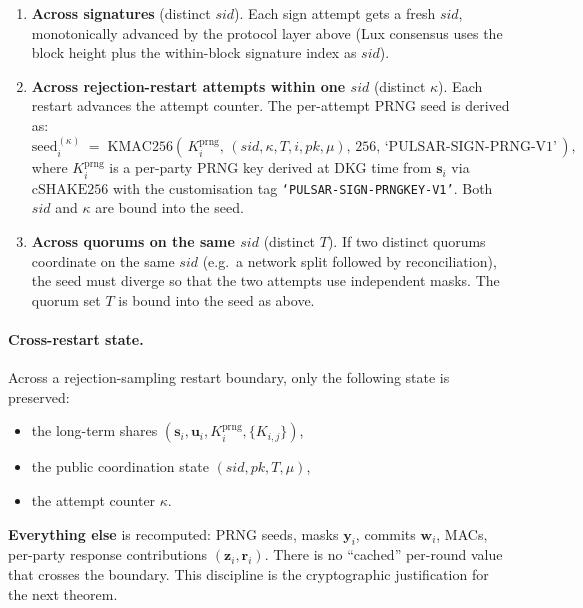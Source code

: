 \documentclass[11pt,a4paper]{article}
\theoremstyle{definition}
\theoremstyle{remark}
\newcommand{\cSHAKE}{\mathrm{cSHAKE256}}
\newcommand{\KMAC}{\mathrm{KMAC256}}
\begin{document}
\begin{enumerate}[leftmargin=*, itemsep=0pt]
\item \textbf{Across signatures} (distinct $\mathit{sid}$). Each
sign attempt gets a fresh $\mathit{sid}$, monotonically advanced
by the protocol layer above (Lux consensus uses the block height
plus the within-block signature index as $\mathit{sid}$).
\item \textbf{Across rejection-restart attempts within one
$\mathit{sid}$} (distinct $\kappa$). Each restart advances the
attempt counter. The per-attempt PRNG seed is derived as:
\[
\text{seed}_i^{(\kappa)} \;=\;
\KMAC(\,K_i^{\mathrm{prng}},\,
(\mathit{sid}, \kappa, T, i, \mathit{pk}, \mu),\,
256,\,
\text{`PULSAR-SIGN-PRNG-V1'}\,),
\]
where $K_i^{\mathrm{prng}}$ is a per-party PRNG key derived at DKG
time from $\mathbf{s}_i$ via $\cSHAKE$ with the customisation tag
\texttt{`PULSAR-SIGN-PRNGKEY-V1'}. Both $\mathit{sid}$ and $\kappa$
are bound into the seed.
\item \textbf{Across quorums on the same $\mathit{sid}$} (distinct
$T$). If two distinct quorums coordinate on the same $\mathit{sid}$
(e.g.\ a network split followed by reconciliation), the seed must
diverge so that the two attempts use independent masks. The
quorum set $T$ is bound into the seed as above.
\end{enumerate}

\paragraph{Cross-restart state.}
Across a rejection-sampling restart boundary, only the following
state is preserved:
\begin{itemize}[leftmargin=*, itemsep=0pt]
\item the long-term shares $(\mathbf{s}_i, \mathbf{u}_i, K_i^{\mathrm{prng}}, \{K_{i,j}\})$,
\item the public coordination state $(\mathit{sid}, \mathit{pk}, T, \mu)$,
\item the attempt counter $\kappa$.
\end{itemize}
\textbf{Everything else} is recomputed: PRNG seeds, masks
$\mathbf{y}_i$, commits $\mathbf{w}_i$, MACs, per-party response
contributions $(\mathbf{z}_i, \mathbf{r}_i)$. There is no
``cached'' per-round value that crosses the boundary. This
discipline is the cryptographic justification for the next theorem.
\end{document}
